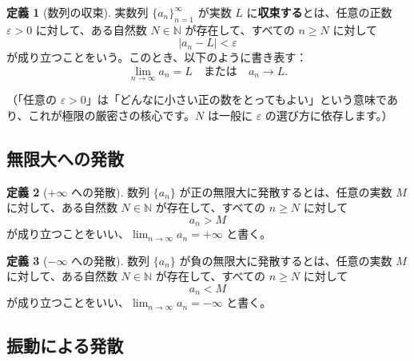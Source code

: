 \documentclass[11pt,a4paper]{jsarticle}
\theoremstyle{definition}
\newtheorem{definition}{定義}[section]
\newcommand{\N}{\mathbb{N}}
\newcommand{\eps}{\varepsilon}
\newcommand{\tendsto}{\longrightarrow}
\newcommand{\kaisetsu}[1]{\textcolor{darkblue!70!black}{\small（#1）}}
\begin{document}
\begin{definitionbox}[定義：有限値への収束]
\begin{definition}[数列の収束]\label{def:shuusoku}
実数列 $\{a_n\}_{n=1}^{\infty}$ が実数 $L$ に\textbf{収束する}とは、任意の正数 $\eps > 0$ に対して、ある自然数 $N \in \N$ が存在して、すべての $n \geq N$ に対して
\[
|a_n - L| < \eps
\]
が成り立つことをいう。このとき、以下のように書き表す：
\[
\lim_{n \to \infty} a_n = L
\quad \text{または} \quad
a_n \tendsto L.
\]
\end{definition}
\kaisetsu{「任意の $\eps > 0$」は「どんなに小さい正の数をとってもよい」という意味であり、これが極限の厳密さの核心です。$N$ は一般に $\eps$ の選び方に依存します。}
\end{definitionbox}

\subsection{無限大への発散}

\begin{definitionbox}[定義：正の無限大への発散]
\begin{definition}[$+\infty$ への発散]\label{def:plus-infty}
数列 $\{a_n\}$ が正の無限大に発散するとは、任意の実数 $M$ に対して、ある自然数 $N \in \N$ が存在して、すべての $n \geq N$ に対して
\[
a_n > M
\]
が成り立つことをいい、$\displaystyle\lim_{n \to \infty} a_n = +\infty$ と書く。
\end{definition}
\end{definitionbox}

\begin{definitionbox}[定義：負の無限大への発散]
\begin{definition}[$-\infty$ への発散]\label{def:minus-infty}
数列 $\{a_n\}$ が負の無限大に発散するとは、任意の実数 $M$ に対して、ある自然数 $N \in \N$ が存在して、すべての $n \geq N$ に対して
\[
a_n < M
\]
が成り立つことをいい、$\displaystyle\lim_{n \to \infty} a_n = -\infty$ と書く。
\end{definition}
\end{definitionbox}

\subsection{振動による発散}
\end{document}
